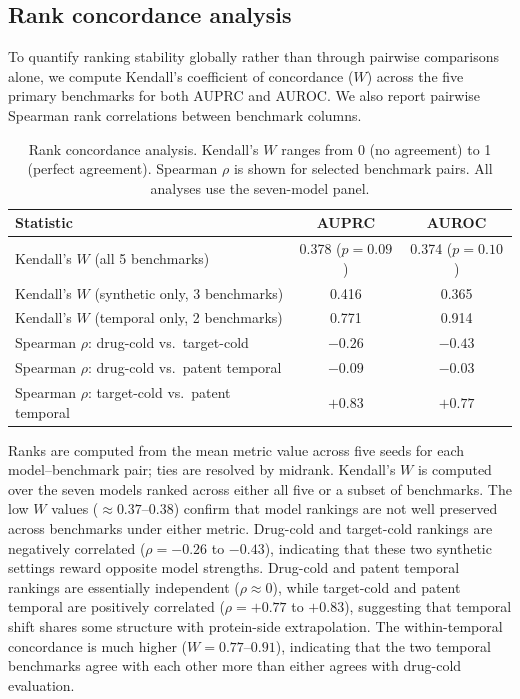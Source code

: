\documentclass[referee,pdflatex,sn-basic,Numbered]{sn-jnl}
\newcommand{\AUPRC}{AUPRC}
\newcommand{\AUROC}{AUROC}
\begin{document}
\begin{appendices}
\section{Rank concordance analysis}
\label{sec:rank-concordance}

To quantify ranking stability globally rather than through pairwise comparisons alone, we compute Kendall's coefficient of concordance ($W$) across the five primary benchmarks for both \AUPRC{} and \AUROC{}. We also report pairwise Spearman rank correlations between benchmark columns.

\begin{table}[t]
  \centering
  \scriptsize
  \caption{Rank concordance analysis. Kendall's $W$ ranges from 0 (no agreement) to 1 (perfect agreement). Spearman $\rho$ is shown for selected benchmark pairs. All analyses use the seven-model panel.}
  \label{tab:rank-concordance}
  \setlength{\tabcolsep}{3.5pt}
  \begin{tabular*}{\textwidth}{@{\extracolsep{\fill}}lcc@{}}
    \toprule
    Statistic & \AUPRC{} & \AUROC{} \\
    \midrule
    Kendall's $W$ (all 5 benchmarks) & 0.378 ($p=0.09$) & 0.374 ($p=0.10$) \\
    Kendall's $W$ (synthetic only, 3 benchmarks) & 0.416 & 0.365 \\
    Kendall's $W$ (temporal only, 2 benchmarks) & 0.771 & 0.914 \\
    \midrule
    Spearman $\rho$: drug-cold vs.\ target-cold & $-0.26$ & $-0.43$ \\
    Spearman $\rho$: drug-cold vs.\ patent temporal & $-0.09$ & $-0.03$ \\
    Spearman $\rho$: target-cold vs.\ patent temporal & $+0.83$ & $+0.77$ \\
    \bottomrule
  \end{tabular*}
\end{table}

Ranks are computed from the mean metric value across five seeds for each model--benchmark pair; ties are resolved by midrank. Kendall's $W$ is computed over the seven models ranked across either all five or a subset of benchmarks. The low $W$ values ($\approx 0.37$--$0.38$) confirm that model rankings are not well preserved across benchmarks under either metric. Drug-cold and target-cold rankings are negatively correlated ($\rho = -0.26$ to $-0.43$), indicating that these two synthetic settings reward opposite model strengths. Drug-cold and patent temporal rankings are essentially independent ($\rho \approx 0$), while target-cold and patent temporal are positively correlated ($\rho = +0.77$ to $+0.83$), suggesting that temporal shift shares some structure with protein-side extrapolation. The within-temporal concordance is much higher ($W = 0.77$--$0.91$), indicating that the two temporal benchmarks agree with each other more than either agrees with drug-cold evaluation.


\end{appendices}
\end{document}
